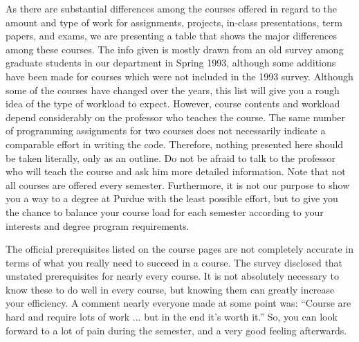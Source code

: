 As there are substantial differences among the courses offered in regard to the amount and type of work for assignments, projects, in-class presentations, term papers, and exams, we are presenting a table that shows the major differences among these courses. The info given is mostly drawn from an old survey among graduate students in our department in Spring 1993, although some additions have been made for courses which were not included in the 1993 survey. Although some of the courses have changed over the years, this list will give you a rough idea of the type of workload to expect. However, course contents and workload depend considerably on the professor who teaches the course. The same number of programming assignments for two courses does not necessarily indicate a comparable effort in writing the code. Therefore, nothing presented here should be taken literally, only as an outline. Do not be afraid to talk to the professor who will teach the course and ask him more detailed information. Note that not all courses are offered every semester. Furthermore, it is not our purpose to show you a way to a degree at Purdue with the least possible effort, but to give you the chance to balance your course load for each semester according to your interests and degree program requirements.

The official prerequisites listed on the course pages are not completely accurate in terms of what you really need to succeed in a course. The survey disclosed that unstated prerequisites for nearly every course. It is not absolutely necessary to know these to do well in every course, but knowing them can greatly increase your efficiency. A comment nearly everyone made at some point was: ``Course are hard and require lots of work ... but in the end it's worth it.'' So, you can look forward to a lot of pain during the semester, and a very good feeling afterwards.

